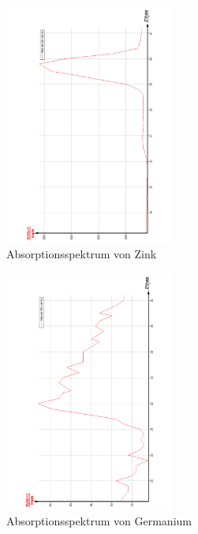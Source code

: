 \begin{figure}
  \centering
  \includegraphics[width=0.5\textwidth, angle=270]{bilder/AbsorpZn.pdf}
  \caption{Absorptionsspektrum von Zink}
  \label{fig:Zink}
\end{figure}

\begin{figure}
  \centering
  \includegraphics[width=0.5\textwidth, angle=270]{bilder/AbsorpGe.pdf}
  \caption{Absorptionsspektrum von Germanium}
  \label{fig:Germanium}
\end{figure}

